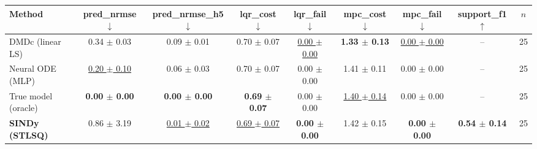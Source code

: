 \begin{tabular}{lcccccccc}
\toprule
Method & pred\_nrmse $\downarrow$ & pred\_nrmse\_h5 $\downarrow$ & lqr\_cost $\downarrow$ & lqr\_fail $\downarrow$ & mpc\_cost $\downarrow$ & mpc\_fail $\downarrow$ & support\_f1 $\uparrow$ & $n$ \\
\midrule
DMDc (linear LS) & 0.34 $\pm$ 0.03 & 0.09 $\pm$ 0.01 & 0.70 $\pm$ 0.07 & \underline{0.00 $\pm$ 0.00} & \textbf{1.33 $\pm$ 0.13} & \underline{0.00 $\pm$ 0.00} & -- & 25 \\
Neural ODE (MLP) & \underline{0.20 $\pm$ 0.10} & 0.06 $\pm$ 0.03 & 0.70 $\pm$ 0.07 & 0.00 $\pm$ 0.00 & 1.41 $\pm$ 0.11 & 0.00 $\pm$ 0.00 & -- & 25 \\
True model (oracle) & \textbf{0.00 $\pm$ 0.00} & \textbf{0.00 $\pm$ 0.00} & \textbf{0.69 $\pm$ 0.07} & 0.00 $\pm$ 0.00 & \underline{1.40 $\pm$ 0.14} & 0.00 $\pm$ 0.00 & -- & 25 \\
\textbf{SINDy (STLSQ)} & 0.86 $\pm$ 3.19 & \underline{0.01 $\pm$ 0.02} & \underline{0.69 $\pm$ 0.07} & \textbf{0.00 $\pm$ 0.00} & 1.42 $\pm$ 0.15 & \textbf{0.00 $\pm$ 0.00} & \textbf{0.54 $\pm$ 0.14} & 25 \\
\bottomrule
\end{tabular}
